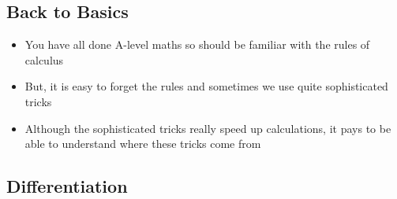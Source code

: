 
\begin{slide}
\section{Back to Basics}
  
\begin{PauseHighLight}
  \begin{itemize}
  \item You have all done A-level maths so should be familiar with the
    rules of calculus\pause
  \item But, it is easy to forget the rules and sometimes we use quite
    sophisticated tricks\pause
  \item Although the sophisticated tricks really speed up
    calculations, it pays to be able to understand where these tricks
    come from\pause
  \end{itemize}
\end{PauseHighLight}

\end{slide}

\Outline %

\begin{slide}
  \section[-1]{Differentiation}

  \pb \pause {}
  \begin{center}
    \pause
  \end{center}

\end{slide}


